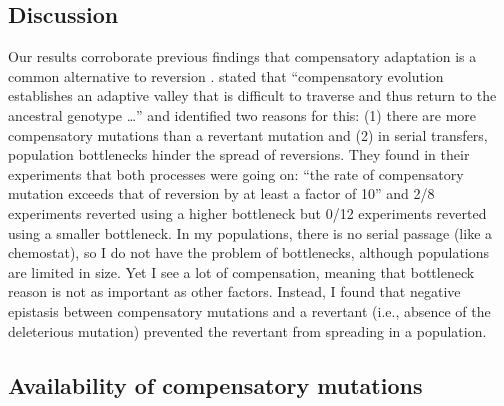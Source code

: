 \begin{doublespace}
\section{Discussion}

Our results corroborate previous findings that compensatory adaptation
is a common alternative to reversion \citep{bur99,moo00,lev00,mai02,est11}.
%
\citet{lev00} stated that ``compensatory evolution
establishes an adaptive valley that is difficult to traverse and thus return to
the ancestral genotype \ldots'' and identified two reasons for this:
(1) there are more compensatory mutations than a revertant mutation and
(2) in serial transfers, population bottlenecks hinder the spread of reversions.
%
They found in their experiments that both processes were going on: ``the rate
of compensatory mutation exceeds that of reversion by at least a factor of 10''
and 2/8 experiments reverted using a higher bottleneck but 0/12 experiments
reverted using a smaller bottleneck.
%
In my populations, there is no serial passage (like a chemostat), so I do
not have the problem of bottlenecks, although populations are limited in size.
%
Yet I see a lot of compensation, meaning that bottleneck
reason is not as important as other factors.
%
Instead, I found that negative epistasis between compensatory mutations
and a revertant (i.e., absence of the deleterious mutation)
prevented the revertant from spreading in a population.



\subsection{Availability of compensatory mutations}


\end{doublespace}
